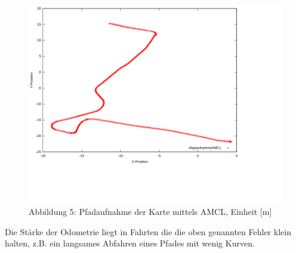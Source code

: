 \documentclass[11pt,a4paper]{article}
\begin{document}
\begin{figure}[H]
    \caption*{Abbildung 5: Pfadaufnahme der Karte mittels AMCL, Einheit [m]}
    \includegraphics[scale = 0.6]{Plots/better ones/mapaufnahmeAMCL.png}
    \centering
\end{figure}
\vspace{-25mm}

Die Stärke der Odometrie liegt in Fahrten die die oben genannten Fehler klein halten, z.B. ein langsames Abfahren eines Pfades mit wenig Kurven.
\end{document}
